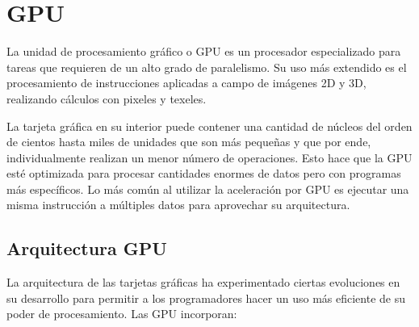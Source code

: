     \section{GPU}
   
    La unidad de procesamiento gráfico o GPU es un procesador especializado para tareas que requieren de un alto grado de paralelismo. Su uso más extendido es el procesamiento de instrucciones aplicadas a campo de imágenes 2D y 3D, realizando cálculos con pixeles y texeles\cite{TX2CU}.
\newline
   
   La tarjeta gráfica en su interior puede contener una cantidad de núcleos del orden de cientos hasta miles de unidades que son más pequeñas y que por ende, individualmente realizan un menor número de operaciones. Esto hace que la GPU esté optimizada para procesar cantidades enormes de datos pero con programas más específicos\cite{gpgpu}. Lo más común al utilizar la aceleración por GPU es ejecutar una misma instrucción a múltiples datos para aprovechar su arquitectura.
   
    \subsection{Arquitectura GPU}

La arquitectura de las tarjetas gráficas ha experimentado ciertas evoluciones en su desarrollo para permitir a los programadores hacer un uso más eficiente de su poder de procesamiento. 
Las GPU incorporan:

